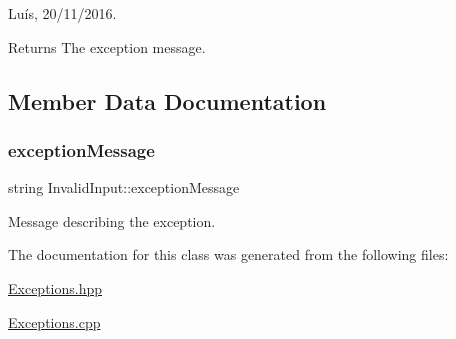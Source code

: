 Luís, 20/11/2016. 

\begin{DoxyReturn}{Returns}
The exception message. 
\end{DoxyReturn}


\subsection{Member Data Documentation}
\hypertarget{class_invalid_input_a0b76d2656afecfe458b1cc1a87dd98c9}{}\label{class_invalid_input_a0b76d2656afecfe458b1cc1a87dd98c9} 
\subsubsection{\texorpdfstring{exception\+Message}{exceptionMessage}}
{\footnotesize\ttfamily string Invalid\+Input\+::exception\+Message\hspace{0.3cm}{\ttfamily [private]}}



Message describing the exception. 



The documentation for this class was generated from the following files\+:\begin{DoxyCompactItemize}
\item 
\hyperlink{_exceptions_8hpp}{Exceptions.\+hpp}\item 
\hyperlink{_exceptions_8cpp}{Exceptions.\+cpp}\end{DoxyCompactItemize}
